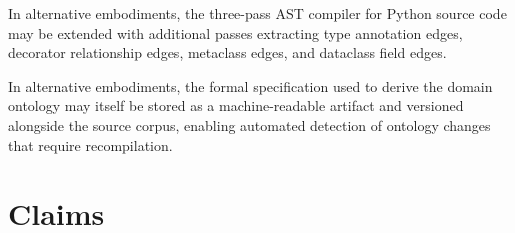 \documentclass[12pt]{article}
\begin{document}
In alternative embodiments, the three-pass AST compiler for Python source code
may be extended with additional passes extracting type annotation edges,
decorator relationship edges, metaclass edges, and dataclass field edges.

In alternative embodiments, the formal specification used to derive the domain
ontology may itself be stored as a machine-readable artifact and versioned
alongside the source corpus, enabling automated detection of ontology changes
that require recompilation.

\newpage
\section*{Claims}
\end{document}
